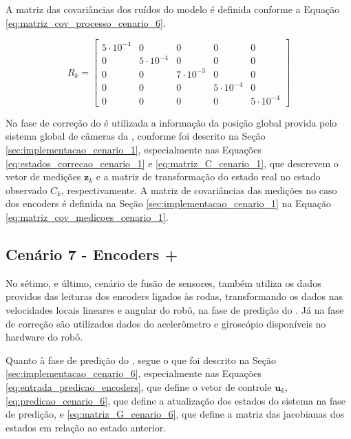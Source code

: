 \documentclass[acronym, symbols, table]{fei}
\begin{document}
			A matriz das covariâncias dos ruídos do modelo é definida conforme a Equação \ref{eq:matriz_cov_processo_cenario_6}.
			
			\begin{equation}\label{eq:matriz_cov_processo_cenario_6}
				R_{k} = \begin{bmatrix}
					5\cdot10^{-4} & 0 & 0 & 0 & 0 \\
					0 & 5\cdot10^{-4} & 0 & 0 & 0 \\
					0 & 0 & 7\cdot10^{-3} & 0 & 0 \\
					0 & 0 & 0 & 5\cdot10^{-4} & 0 \\
					0 & 0 & 0 & 0 & 5\cdot10^{-4}
				\end{bmatrix}
			\end{equation}
		
			Na fase de correção do  é utilizada a informação da posição global provida pelo sistema global de câmeras da , conforme foi descrito na Seção \ref{sec:implementacao_cenario_1}, especialmente nas Equações \ref{eq:estados_correcao_cenario_1} e \ref{eq:matriz_C_cenario_1}, que descrevem o vetor de medições $\textbf{z}_{k}$ e a matriz de transformação do estado real no estado observado $C_{k}$, respectivamente. A matriz de covariâncias das medições no caso dos encoders é definida na Seção \ref{sec:implementacao_cenario_1} na Equação \ref{eq:matriz_cov_medicoes_cenario_1}.
			
		\subsection{Cenário 7 - Encoders + } \label{sec:implementacao_cenario_7}
		
			No sétimo, e último, cenário de fusão de sensores, também utiliza os dados providos das leituras dos encoders ligados às rodas, transformando os dados nas velocidades locais lineares e angular do robô, na fase de predição do . Já na fase de correção são utilizados dados do acelerômetro e giroscópio disponíveis no hardware do robô.
			
			Quanto à fase de predição do , segue o que foi descrito na Seção \ref{sec:implementacao_cenario_6}, especialmente nas Equações \ref{eq:entrada_predicao_encoders}, que define o vetor de controle $\textbf{u}_k$, \ref{eq:predicao_cenario_6}, que define a atualização dos estados do sistema na fase de predição, e \ref{eq:matriz_G_cenario_6}, que define a matriz das jacobianas dos estados em relação ao estado anterior.
			
\end{document}

